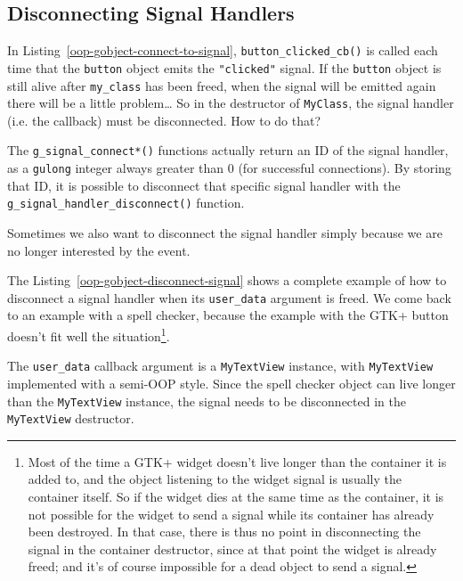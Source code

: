 \subsection{Disconnecting Signal Handlers}

In Listing~\ref{oop-gobject-connect-to-signal}, \lstinline{button_clicked_cb()} is called each time that the \lstinline{button} object emits the \lstinline{"clicked"} signal. If the \lstinline{button} object is still alive after \lstinline{my_class} has been freed, when the signal will be emitted again there will be a little problem… So in the destructor of \lstinline{MyClass}, the signal handler (i.e. the callback) must be disconnected. How to do that?

The \lstinline{g_signal_connect*()} functions actually return an ID of the signal handler, as a \lstinline{gulong} integer always greater than 0 (for successful connections). By storing that ID, it is possible to disconnect that specific signal handler with the \lstinline{g_signal_handler_disconnect()} function.

Sometimes we also want to disconnect the signal handler simply because we are no longer interested by the event.

The Listing~\ref{oop-gobject-disconnect-signal} shows a complete example of how to disconnect a signal handler when its \lstinline{user_data} argument is freed. We come back to an example with a spell checker, because the example with the GTK+ button doesn't fit well the situation\footnote{Most of the time a GTK+ widget doesn't live longer than the container it is added to, and the object listening to the widget signal is usually the container itself. So if the widget dies at the same time as the container, it is not possible for the widget to send a signal while its container has already been destroyed. In that case, there is thus no point in disconnecting the signal in the container destructor, since at that point the widget is already freed; and it's of course impossible for a dead object to send a signal.}.

The \lstinline{user_data} callback argument is a \lstinline{MyTextView} instance, with \lstinline{MyTextView} implemented with a semi-OOP style. Since the spell checker object can live longer than the \lstinline{MyTextView} instance, the signal needs to be disconnected in the \lstinline{MyTextView} destructor.

\vspace{0.7cm}


